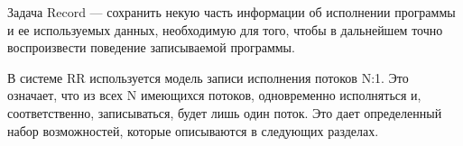 Задача Record — 
сохранить некую часть информации об исполнении программы и ее используемых данных, 
необходимую для того, чтобы в дальнейшем 
точно воспроизвести поведение записываемой программы.

В системе RR используется модель записи исполнения потоков N:1. Это означает, 
что из всех N имеющихся потоков, одновременно исполняться и, соответственно, записываться, будет лишь один поток.
Это дает определенный набор возможностей, которые описываются в следующих разделах.